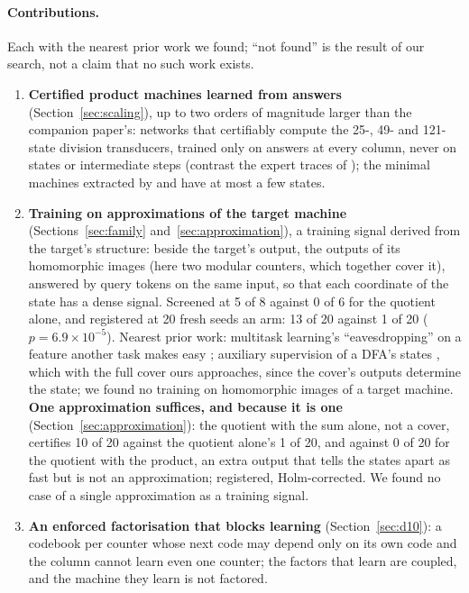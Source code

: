 \documentclass[11pt]{article}
\begin{document}
\paragraph{Contributions.} Each with the nearest prior work we found; ``not found'' is the result of
our search, not a claim that no such work exists.
\begin{enumerate}
\item \textbf{Certified product machines learned from answers} (Section~\ref{sec:scaling}), up to two
  orders of magnitude larger than the companion paper's: networks that certifiably compute the
  25-, 49- and 121-state division transducers, trained only on answers at every column, never
  on states or intermediate steps (contrast the expert traces of
  \citet{papazov-2025-exact-learning-arithmetic-differentiable-agents}); the minimal machines
  extracted by \citet{wang-2019-state-regularized-rnns} and
  \citet{oliva-2020-dual-recurrent-memory-processing} have at most a few states.
\item \textbf{Training on approximations of the target machine} (Sections~\ref{sec:family}
  and~\ref{sec:approximation}), a training
  signal derived from the target's structure: beside the target's output, the outputs of its homomorphic images (here two modular counters, which together
  cover it), answered by query tokens on the same input, so that each coordinate of the state has a
  dense signal. Screened at 5 of 8 against 0 of 6 for the quotient alone, and registered at 20 fresh
  seeds an arm: 13 of 20 against 1 of 20 ($p = 6.9 \times 10^{-5}$). Nearest prior work: multitask learning's
  ``eavesdropping'' on a feature another task makes easy \citep{caruana-1997-multitask-learning};
  auxiliary supervision of a DFA's states \citep{dan-2022-robust-generalization-regular-languages},
  which with the full cover ours approaches, since the cover's outputs determine the state; we found
  no training on homomorphic images of a target machine. \textbf{One approximation suffices, and
  because it is one} (Section~\ref{sec:approximation}): the quotient with the sum alone, not a
  cover, certifies 10 of 20 against the quotient alone's 1 of 20, and against 0 of 20 for the
  quotient with the product, an extra output that tells the states apart as fast but is not an
  approximation; registered, Holm-corrected. We found no case of a single approximation as a
  training signal.
\item \textbf{An enforced factorisation that blocks learning} (Section~\ref{sec:d10}): a codebook
  per counter whose next code may depend only on its own code and the column cannot learn even one
  counter; the factors that learn are coupled, and the machine they learn is not factored.
\end{enumerate}
\end{document}
